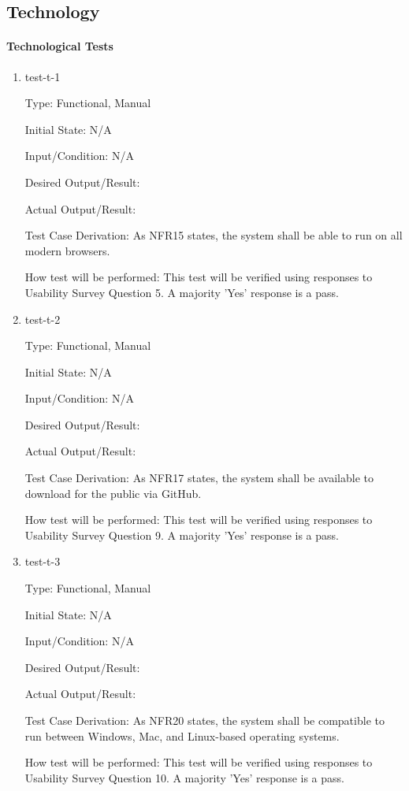 \documentclass[12pt, titlepage]{article}
\begin{document}
\subsection{Technology}

\paragraph{Technological Tests}

\begin{enumerate}

\item{test-t-1\\}

Type: Functional, Manual		

Initial State: N/A	

Input/Condition: N/A		

Desired Output/Result:  

Actual Output/Result:

Test Case Derivation: As NFR15 states, the system shall be able to run on all modern browsers.

How test will be performed: This test will be verified using responses to Usability Survey Question 5. A majority 'Yes' response is a pass.

\item{test-t-2\\}

Type: Functional, Manual

Initial State: N/A

Input/Condition: N/A

Desired Output/Result:  

Actual Output/Result:

Test Case Derivation: As NFR17 states, the system shall be available to download for the public via GitHub.		

How test will be performed: This test will be verified using responses to Usability Survey Question 9. A majority 'Yes' response is a pass.

\item{test-t-3\\}

Type: Functional, Manual

Initial State: N/A

Input/Condition: N/A		

Desired Output/Result:  

Actual Output/Result:

Test Case Derivation: As NFR20 states, the system shall be compatible to run between Windows, Mac, and Linux-based operating systems.		

How test will be performed: This test will be verified using responses to Usability Survey Question 10. A majority 'Yes' response is a pass.

\end{enumerate}
\end{document}
